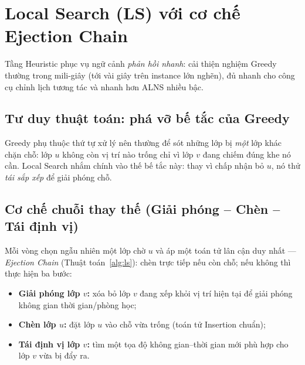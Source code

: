 \section{Local Search (LS) với cơ chế Ejection Chain}
\label{sec:ls}

Tầng Heuristic phục vụ ngữ cảnh \emph{phản hồi nhanh}: cải thiện nghiệm Greedy
thường trong mili-giây (tới vài giây trên instance lớn nghẽn), đủ nhanh cho công
cụ chỉnh lịch tương tác và nhanh hơn ALNS nhiều bậc.

\subsection{Tư duy thuật toán: phá vỡ bế tắc của Greedy}
Greedy phụ thuộc thứ tự xử lý nên thường để sót những lớp bị \emph{một} lớp khác
chặn chỗ: lớp $u$ không còn vị trí nào trống chỉ vì lớp $v$ đang chiếm đúng khe nó
cần. Local Search nhắm chính vào thế bế tắc này: thay vì chấp nhận bỏ $u$, nó thử
\emph{tái sắp xếp} để giải phóng chỗ.

\subsection{Cơ chế chuỗi thay thế (Giải phóng -- Chèn -- Tái định vị)}
Mỗi vòng chọn ngẫu nhiên một lớp chờ $u$ và áp một toán tử lân cận duy nhất ---
\emph{Ejection Chain} (Thuật toán~\ref{alg:ls}): chèn trực tiếp nếu còn chỗ; nếu
không thì thực hiện ba bước:
\begin{itemize}
  \item \textbf{Giải phóng lớp $v$:} xóa bỏ lớp $v$ đang xếp khỏi vị trí hiện tại
  để giải phóng không gian thời gian/phòng học;
  \item \textbf{Chèn lớp $u$:} đặt lớp $u$ vào chỗ vừa trống (toán tử Insertion
  chuẩn);
  \item \textbf{Tái định vị lớp $v$:} tìm một tọa độ không gian--thời gian mới phù
  hợp cho lớp $v$ vừa bị đẩy ra.
\end{itemize}


